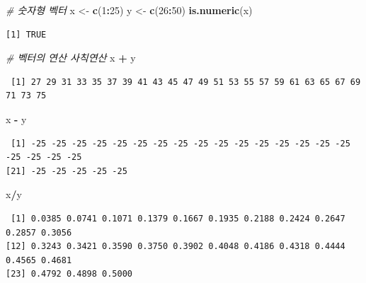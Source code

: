 \documentclass[11pt,a4paper]{book}
\newenvironment{Shaded}{\begin{snugshade}}{\end{snugshade}}
\newcommand{\KeywordTok}[1]{\textcolor[rgb]{0.13,0.29,0.53}{\textbf{#1}}}
\newcommand{\DecValTok}[1]{\textcolor[rgb]{0.00,0.00,0.81}{#1}}
\newcommand{\StringTok}[1]{\textcolor[rgb]{0.31,0.60,0.02}{#1}}
\newcommand{\CommentTok}[1]{\textcolor[rgb]{0.56,0.35,0.01}{\textit{#1}}}
\newcommand{\OperatorTok}[1]{\textcolor[rgb]{0.81,0.36,0.00}{\textbf{#1}}}
\newcommand{\NormalTok}[1]{#1}
\theoremstyle{definition}
\theoremstyle{definition}
\theoremstyle{definition}
\theoremstyle{remark}
\begin{document}
\footnotesize

\begin{Shaded}
\begin{Highlighting}[]
\CommentTok{# 숫자형 벡터}
\NormalTok{x <-}\StringTok{ }\KeywordTok{c}\NormalTok{(}\DecValTok{1}\OperatorTok{:}\DecValTok{25}\NormalTok{)}
\NormalTok{y <-}\StringTok{ }\KeywordTok{c}\NormalTok{(}\DecValTok{26}\OperatorTok{:}\DecValTok{50}\NormalTok{)}
\KeywordTok{is.numeric}\NormalTok{(x)}
\end{Highlighting}
\end{Shaded}

\begin{verbatim}
[1] TRUE
\end{verbatim}

\begin{Shaded}
\begin{Highlighting}[]
\CommentTok{# 벡터의 연산 사칙연산}
\NormalTok{x }\OperatorTok{+}\StringTok{ }\NormalTok{y}
\end{Highlighting}
\end{Shaded}

\begin{verbatim}
 [1] 27 29 31 33 35 37 39 41 43 45 47 49 51 53 55 57 59 61 63 65 67 69 71 73 75
\end{verbatim}

\begin{Shaded}
\begin{Highlighting}[]
\NormalTok{x }\OperatorTok{-}\StringTok{ }\NormalTok{y}
\end{Highlighting}
\end{Shaded}

\begin{verbatim}
 [1] -25 -25 -25 -25 -25 -25 -25 -25 -25 -25 -25 -25 -25 -25 -25 -25 -25 -25 -25 -25
[21] -25 -25 -25 -25 -25
\end{verbatim}

\begin{Shaded}
\begin{Highlighting}[]
\NormalTok{x}\OperatorTok{/}\NormalTok{y}
\end{Highlighting}
\end{Shaded}

\begin{verbatim}
 [1] 0.0385 0.0741 0.1071 0.1379 0.1667 0.1935 0.2188 0.2424 0.2647 0.2857 0.3056
[12] 0.3243 0.3421 0.3590 0.3750 0.3902 0.4048 0.4186 0.4318 0.4444 0.4565 0.4681
[23] 0.4792 0.4898 0.5000
\end{verbatim}
\end{document}
